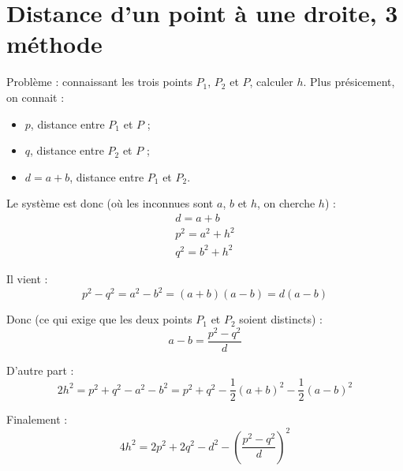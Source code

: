 \section{Distance d'un point à une droite, 3 méthode}


\begin{center}
\end{center}

Problème : connaissant les trois points $P_1$, $P_2$ et $P$, calculer $h$. Plus présicement, on connait :
\begin{itemize}
  \item $p$, distance entre $P_1$ et $P$ ;
  \item $q$, distance entre $P_2$ et $P$ ;
  \item $d = a + b$, distance entre $P_1$ et $P_2$.
\end{itemize}

Le système est donc (où les inconnues sont $a$, $b$ et $h$, on cherche $h$) :
\begin{equation*}
  \begin{array}{r}
    d = a + b \\
    p^2 = a^2 + h^2 \\
    q^2 = b^2 + h^2
  \end{array}
\end{equation*}

Il vient :
\begin{equation*}
 p^2 - q^2 = a^2 - b^2 = (a + b) (a- b) = d (a - b)
\end{equation*}

Donc (ce qui exige que les deux points $P_1$ et $P_2$ soient distincts) :
\begin{equation*}
 a - b = \frac{p^2 - q^2}{d}
\end{equation*}

D'autre part :
\begin{equation*}
 2 h^2 = p^2 + q^2 - a^2 - b^2 = p^2 + q^2 - \frac{1}{2} (a+b)^2 - \frac{1}{2} (a-b)^2
\end{equation*}

Finalement :
\begin{equation*}
 4 h^2 = 2 p^2 + 2 q^2 -d^2 - (\frac{p^2 - q^2}{d})^2
\end{equation*}


